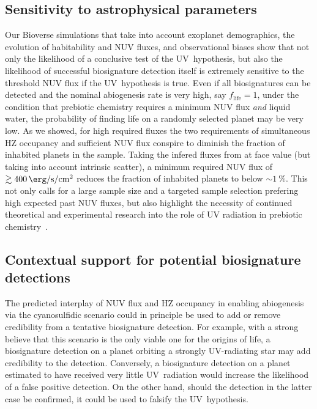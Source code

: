 \documentclass[twocolumn,twocolappendix,linenumbers]{aastex631}
\begin{document}
\subsection{Sensitivity to astrophysical parameters} %
Our Bioverse simulations that take into account exoplanet demographics, the evolution of habitability and \gls{NUV} fluxes, and observational biases show that not only the likelihood of a conclusive test of the UV~hypothesis, but also the likelihood of successful biosignature detection itself is extremely sensitive to the threshold \gls{NUV} flux if the UV~hypothesis is true.
Even if all biosignatures can be detected and the nominal abiogenesis rate is very high, say $f_\mathrm{life} = 1$, under the condition that prebiotic chemistry requires a minimum \gls{NUV} flux \textit{and} liquid water, the probability of finding life on a randomly selected planet may be very low.
As we showed, for high required fluxes the two requirements of simultaneous \gls{HZ} occupancy and sufficient \gls{NUV} flux conspire to diminish the fraction of inhabited planets in the sample.
Taking the infered fluxes from \citet{Richey-Yowell2023} at face value (but taking into account intrinsic scatter), a minimum required \gls{NUV} flux of $\gtrsim\SI{400}{\erg\per\second\per\centi\meter\squared}$ reduces the fraction of inhabited planets to below $\sim\SI{1}{\percent}$.
This not only calls for a large sample size and a targeted sample selection prefering high expected past \gls{NUV} fluxes, but also highlight the necessity of continued theoretical and experimental research into the role of UV radiation in prebiotic chemistry~\citep{Ranjan2017b}.





\subsection{Contextual support for potential biosignature detections} %
The predicted interplay of \gls{NUV} flux and \gls{HZ} occupancy in enabling abiogenesis via the cyanosulfidic scenario could in principle be used to add or remove credibility from a tentative biosignature detection.
For example, with a strong believe that this scenario is the only viable one for the origins of life, a biosignature detection on a planet orbiting a strongly UV-radiating star may add credibility to the detection.
Conversely, a biosignature detection on a planet estimated to have received very little UV~radiation would increase the likelihood of a false positive detection.
On the other hand, should the detection in the latter case be confirmed, it could be used to falsify the UV~hypothesis.
\end{document}
